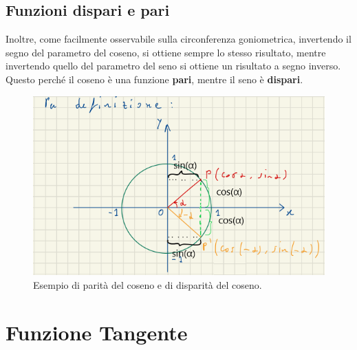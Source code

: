 \documentclass[12pt]{article}
\begin{document}
\subsection{Funzioni dispari e pari}
Inoltre, come facilmente osservabile sulla circonferenza goniometrica, invertendo il segno del parametro del coseno, si ottiene sempre lo stesso risultato, mentre invertendo quello del parametro del seno si ottiene un risultato a segno inverso.\\
Questo perché il coseno è una funzione \textbf{pari}, mentre il seno è \textbf{dispari}.
\begin{figure}[!htb]
    \centering
    \includegraphics[width=1\textwidth, height=.7\textheight,keepaspectratio]{lezione_6/sin_cos_dispari_pari.PNG}
    \begin{center}
        \caption{\label{fig:sin_cos_dispari_pari}Esempio di parità del coseno e di disparità del coseno.}
    \end{center}
\end{figure}
\section{Funzione Tangente}
\end{document}
